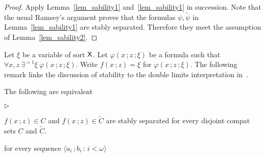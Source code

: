 \documentclass{amsproc}
\newcommand{\mylabel}[1]{{#1}\hfill}
\renewenvironment{itemize}
  {\begin{list}{$\triangleright$}{%
  \setlength{\parskip}{0mm}
  \setlength{\topsep}{.4\baselineskip}
  \setlength{\rightmargin}{0mm}
  \setlength{\listparindent}{0mm}
  \setlength{\itemindent}{0mm}
  \setlength{\labelwidth}{3ex}
  \setlength{\itemsep}{.2\baselineskip}
  \setlength{\parsep}{.2\baselineskip}
  \setlength{\partopsep}{0mm}
  \setlength{\labelsep}{1ex}
  \setlength{\leftmargin}{\labelwidth+\labelsep}
  \let\makelabel\mylabel}}{%
\end{list}}
\begin{document}
{\begin{theorem}
  
\end{theorem}

\begin{proof}
  Apply Lemma~\ref{lem_sability1} and~\ref{lem_sability1} in succession.
  Note that the usual Ramsey's argument proves that the formulas $\psi,\tilde\psi$ in Lemma~\ref{lem_sability1} are stably separated.
  Therefore they meet the assumption of Lemma~\ref{lem_sability2}.
\end{proof}

Let $\xi$ be a variable of sort ${\sf X}$.
Let $\varphi(x\,;z\,;\xi)$ be a formula such that $\forall x,z\ \exists^{=1}\xi\ \varphi(x\,;z\,;\xi)$.
Write $f(x\,;z)=\xi$ for $\varphi(x\,;z\,;\xi)$.
The following remark links the discussion of stability to the double limits interpretation in~\cite{BY}.

\begin{remark}
  The following are equivalent 
  \begin{itemize}
    \item[1.] $f(x\,;z)\in C$ and $f(x\,;z)\in\tilde C$ are stably separated for every disjoint compat sets $C$ and $\tilde C$.
    \item[2.] for every sequence $\langle a_i\,;b_i\,:\,i<\omega\rangle$ 
    
  \end{itemize}
\end{remark}
\newcommand\biburl[1]{\url{#1}}

\begin{bibdiv}
\begin{biblist}[]\normalsize



\end{biblist}
\end{bibdiv}}
\end{document}
